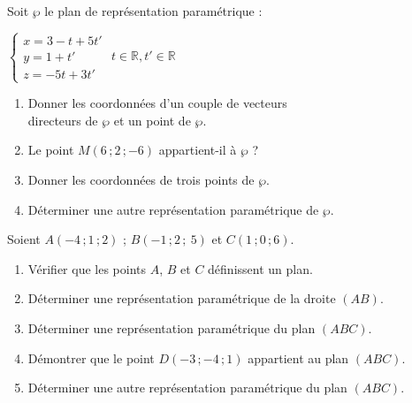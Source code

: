 \documentclass{cornouaille}
\begin{document}


\begin{exercice}
  Soit $\wp$ le plan de représentation paramétrique :

  \begin{center}
    $\begin{cases}x=3-t+5t' \\y=1+t' \\z=-5t+3t' \end{cases}$
    $t\in\mathbb{R}, t'\in\mathbb{R}$
  \end{center}

  \begin{enumerate}
  \item Donner les coordonnées d'un couple de vecteurs\\ directeurs de
    $\wp$ et un point de $\wp$.
  \item Le point $M(6\,;2\,;-6)$ appartient-il à $\wp$ ?
  \item Donner les coordonnées de trois points de $\wp$.
  \item Déterminer une autre représentation paramétrique de $\wp$.
  \end{enumerate}
\end{exercice}

%

\begin{exercice}
  Soient $A(-4\,;1\,; 2)$ ; $B(-1\,; 2\,;\ 5)$ et $C(1\,; 0 \,; 6)$.
  \begin{enumerate}
  \item Vérifier que les points $A$, $B$ et $C$ définissent un plan.
  \item Déterminer une représentation paramétrique de la droite
    $(AB)$.
  \item Déterminer une représentation paramétrique du plan $(ABC)$.
  \item Démontrer que le point $D(-3\,;-4\,;1)$ appartient au plan
    $(ABC)$.
  \item Déterminer une autre représentation paramétrique du plan
    $(ABC)$.
  \end{enumerate}
\end{exercice}
\end{document}
